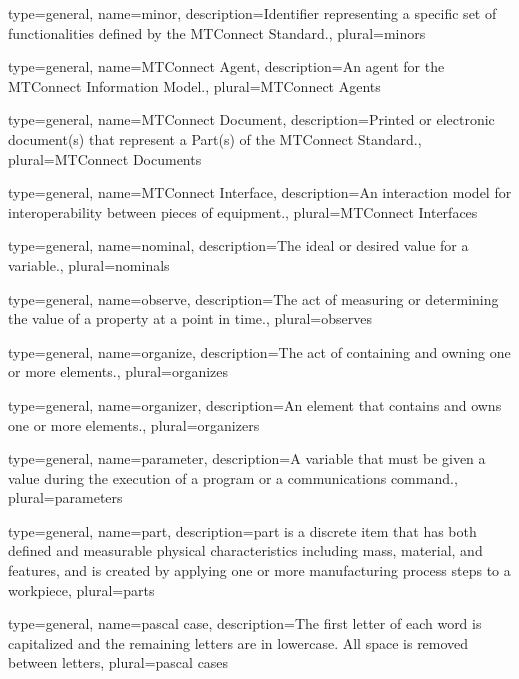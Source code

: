 {
	type={general},
    name={minor},
	description={Identifier representing a specific set of functionalities defined by the MTConnect Standard.},
	plural={minors}
}

{
	type={general},
    name={MTConnect Agent},
	description={An \gls{agent} for the \gls{MTConnect Information Model}.},
	plural={MTConnect Agents}
}

{
	type={general},
    name={MTConnect Document},
	description={Printed or electronic document(s) that represent a Part(s) of the MTConnect Standard.},
	plural={MTConnect Documents}
}

{
	type={general},
    name={MTConnect Interface},
	description={An \gls{interaction model} for interoperability between pieces of equipment.},
	plural={MTConnect Interfaces}
}

{
	type={general},
    name={nominal},
	description={The ideal or desired value for a variable.},
	plural={nominals}
}

{
	type={general},
    name={observe},
	description={The act of measuring or determining the value of a property at a point in time.},
	plural={observes}
}

{
	type={general},
    name={organize},
	description={The act of containing and owning one or more elements.},
	plural={organizes}
}

{
	type={general},
    name={organizer},
	description={An element that contains and owns one or more elements.},
	plural={organizers}
}

{
	type={general},
    name={parameter},
	description={A variable that must be given a value during the execution of a program or a communications command.},
	plural={parameters}
}

{
	type={general},
    name={part},
	description={\gls{part} is a discrete item that has both defined and measurable physical characteristics including mass, material, and features, and is created by applying one or more manufacturing process steps to a workpiece},
	plural={parts}
}

{
	type={general},
    name={pascal case},
	description={The first letter of each word is capitalized and the remaining letters are in lowercase. All space is removed between letters},
	plural={pascal cases}
}

